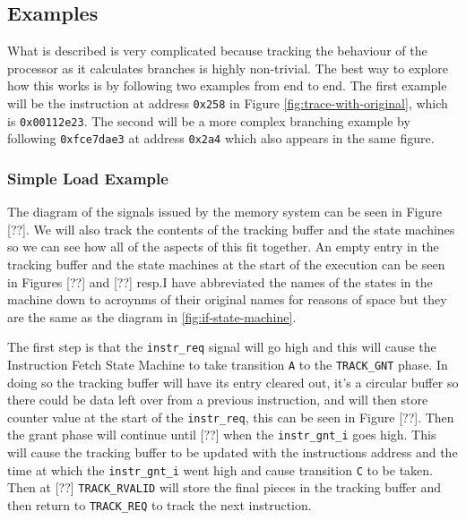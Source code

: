 \subsection{Examples}

What is described is very complicated because tracking the behaviour of the processor as it calculates branches is highly non-trivial. The best way to explore how this works is by following two examples from end to end. The first example will be the instruction at address \texttt{0x258} in Figure \ref{fig:trace-with-original}, which is \texttt{0x00112e23}. The second will be a more complex branching example by following \texttt{0xfce7dae3} at address \texttt{0x2a4} which also appears in the same figure.

\subsubsection{Simple Load Example}

The diagram of the signals issued by the memory system can be seen in Figure [??]. We will also track the contents of the tracking buffer and the state machines so we can see how all of the aspects of this fit together. An empty entry in the tracking buffer and the state machines at the start of the execution can be seen in Figures [??] and [??] resp.I have abbreviated the names of the states in the machine down to acroynms of their original names for reasons of space but they are the same as the diagram in \ref{fig:if-state-machine}. 




The first step is that the \texttt{instr\_req} signal will go high and this will cause the Instruction Fetch State Machine to take transition \texttt{A} to the \texttt{TRACK\_GNT} phase. In doing so the tracking buffer will have its entry cleared out, it's a circular buffer so there could be data left over from a previous instruction, and will then store counter value at the start of the \texttt{instr\_req}, this can be seen in Figure [??]. Then the grant phase will continue until [??] when the \texttt{instr\_gnt\_i} goes high. This will cause the tracking buffer to be updated with the instructions address and the time at which the \texttt{instr\_gnt\_i} went high and cause transition \texttt{C} to be taken. Then at [??] \texttt{TRACK\_RVALID} will store the final pieces in the tracking buffer and then return to \texttt{TRACK\_REQ} to track the next instruction. 

